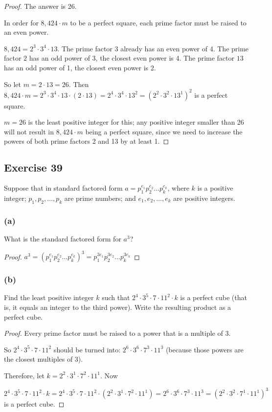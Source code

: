 \documentclass[14pt]{extarticle}
\begin{document}
\begin{proof}
    The answer is 26.

    In order for $8,424 \cdot m$ to be a perfect square, each prime factor must be raised to an even power.

    $8,424 = 2^3 \cdot 3^4 \cdot 13$. The prime factor $3$ already has an even power of 4. The prime factor $2$ has an odd power of 3, the closest even power is 4. The prime factor $13$ has an odd power of 1, the closest even power is 2.

    So let $m = 2 \cdot 13 = 26$. Then $8,424 \cdot m = 2^3 \cdot 3^4 \cdot 13 \cdot (2 \cdot 13) = 2^4 \cdot 3^4 \cdot 13^2 = (2^2 \cdot 3^2 \cdot 13^1)^2$ is a perfect square.

    $m = 26$ is the least positive integer for this; any positive integer smaller than 26 will not result in $8,424 \cdot m$ being a perfect square, since we need to increase the powers of both prime factors 2 and 13 by at least 1.
\end{proof}

\subsection{Exercise 39}
Suppose that in standard factored form $a = p_1^{e_1} p_2^{e_2} \ldots p_k^{e_k}$, where $k$ is a positive integer; $p_1, p_2, \ldots, p_k$ are prime numbers; and $e_1, e_2, \ldots , e_k$ are positive integers.

\subsubsection{(a)}
What is the standard factored form for $a^3$?

\begin{proof}
    $a^3 = (p_1^{e_1} p_2^{e_2} \ldots p_k^{e_k})^3 = p_1^{3e_1} p_2^{3e_2} \ldots p_k^{3e_k}$
\end{proof}

\subsubsection{(b)}
Find the least positive integer $k$ such that $2^4 \cdot 3^5 \cdot 7 \cdot 11^2 \cdot k$ is a perfect cube (that is, it equals an integer to the third power). Write the resulting product as a perfect cube.

\begin{proof}
    Every prime factor must be raised to a power that is a multiple of 3.

    So $2^4 \cdot 3^5 \cdot 7 \cdot 11^2$ should be turned into: $2^6 \cdot 3^6 \cdot 7^3 \cdot 11^3$ (because those powers are the closest multiples of 3).

    Therefore, let $k = 2^2 \cdot 3^1 \cdot 7^2 \cdot 11^1$. Now

    $2^4 \cdot 3^5 \cdot 7 \cdot 11^2 \cdot k = 2^4 \cdot 3^5 \cdot 7 \cdot 11^2 \cdot (2^2 \cdot 3^1 \cdot 7^2 \cdot 11^1) = 2^6 \cdot 3^6 \cdot 7^3 \cdot 11^3 = (2^2 \cdot 3^2 \cdot 7^1 \cdot 11^1)^3$ is a perfect cube.
\end{proof}
\end{document}
